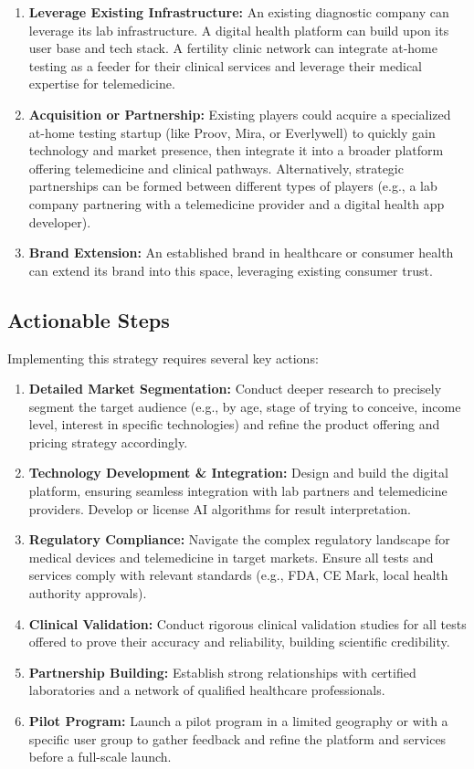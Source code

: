 \documentclass{article}
\begin{document}
\begin{enumerate}
    \item \textbf{Leverage Existing Infrastructure:} An existing diagnostic company can leverage its lab infrastructure. A digital health platform can build upon its user base and tech stack. A fertility clinic network can integrate at-home testing as a feeder for their clinical services and leverage their medical expertise for telemedicine.
    \item \textbf{Acquisition or Partnership:} Existing players could acquire a specialized at-home testing startup (like Proov, Mira, or Everlywell) to quickly gain technology and market presence, then integrate it into a broader platform offering telemedicine and clinical pathways. Alternatively, strategic partnerships can be formed between different types of players (e.g., a lab company partnering with a telemedicine provider and a digital health app developer).
    \item \textbf{Brand Extension:} An established brand in healthcare or consumer health can extend its brand into this space, leveraging existing consumer trust.
\end{enumerate}

\subsection{Actionable Steps}

Implementing this strategy requires several key actions:

\begin{enumerate}
    \item \textbf{Detailed Market Segmentation:} Conduct deeper research to precisely segment the target audience (e.g., by age, stage of trying to conceive, income level, interest in specific technologies) and refine the product offering and pricing strategy accordingly.
    \item \textbf{Technology Development \& Integration:} Design and build the digital platform, ensuring seamless integration with lab partners and telemedicine providers. Develop or license AI algorithms for result interpretation.
    \item \textbf{Regulatory Compliance:} Navigate the complex regulatory landscape for medical devices and telemedicine in target markets. Ensure all tests and services comply with relevant standards (e.g., FDA, CE Mark, local health authority approvals).
    \item \textbf{Clinical Validation:} Conduct rigorous clinical validation studies for all tests offered to prove their accuracy and reliability, building scientific credibility.
    \item \textbf{Partnership Building:} Establish strong relationships with certified laboratories and a network of qualified healthcare professionals.
    \item \textbf{Pilot Program:} Launch a pilot program in a limited geography or with a specific user group to gather feedback and refine the platform and services before a full-scale launch.
\end{enumerate}
\end{document}
